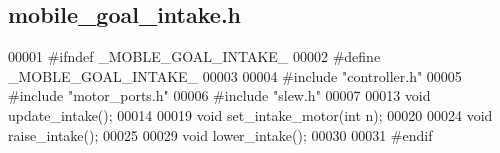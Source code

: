 \subsection{mobile\+\_\+goal\+\_\+intake.\+h}
\label{mobile__goal__intake_8h_source}

\begin{DoxyCode}
00001 \textcolor{preprocessor}{#ifndef \_MOBLE\_GOAL\_INTAKE\_}
00002 \textcolor{preprocessor}{#define \_MOBLE\_GOAL\_INTAKE\_}
00003 
00004 \textcolor{preprocessor}{#include "controller.h"}
00005 \textcolor{preprocessor}{#include "motor_ports.h"}
00006 \textcolor{preprocessor}{#include "slew.h"}
00007 
00013 \textcolor{keywordtype}{void} update_intake();
00014 
00019 \textcolor{keywordtype}{void} set_intake_motor(\textcolor{keywordtype}{int} n);
00020 
00024 \textcolor{keywordtype}{void} raise_intake();
00025 
00029 \textcolor{keywordtype}{void} lower_intake();
00030 
00031 \textcolor{preprocessor}{#endif}
\end{DoxyCode}
